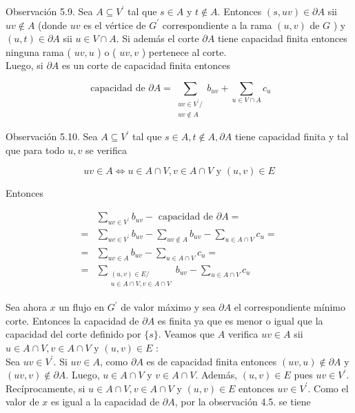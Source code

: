 \documentclass[10pt]{article}
\begin{document}
Observación 5.9. Sea $A \subseteq V^{\prime}$ tal que $s \in A$ y $t \notin A$. Entonces $(s, u v) \in \partial A$ sii $u v \notin A$ (donde $u v$ es el vértice de $G^{\prime}$ correspondiente a la rama $(u, v)$ de $G$ ) y $(u, t) \in \partial A$ sii $u \in V \cap A$. Si además el corte $\partial A$ tiene capacidad finita entonces ninguna rama ( $u v, u$ ) o ( $u v, v$ ) pertenece al corte.\\
Luego, si $\partial A$ es un corte de capacidad finita entonces

$$
\text { capacidad de } \partial A=\sum_{\substack{u v \in V^{\prime} / \\ u v \notin A}} b_{u v}+\sum_{u \in V \cap A} c_{u}
$$

Observación 5.10. Sea $A \subseteq V^{\prime}$ tal que $s \in A, t \notin A, \partial A$ tiene capacidad finita y tal que para todo $u, v$ se verifica

$$
u v \in A \Longleftrightarrow u \in A \cap V, v \in A \cap V \text { y }(u, v) \in E
$$

Entonces

$$
\begin{aligned}
& \sum_{u v \in V^{\prime}} b_{u v}-\text { capacidad de } \partial A= \\
= & \sum_{u v \in V^{\prime}} b_{u v}-\sum_{u v \notin A} b_{u v}-\sum_{u \in A \cap V} c_{u}= \\
= & \sum_{u v \in A} b_{u v}-\sum_{u \in A \cap V} c_{u}= \\
= & \sum_{\substack{(u, v) \in E / \\
u \in A \cap V, v \in A \cap V}} b_{u v}-\sum_{u \in A \cap V} c_{u}
\end{aligned}
$$

Sea ahora $x$ un flujo en $G^{\prime}$ de valor máximo y sea $\partial A$ el correspondiente mínimo corte. Entonces la capacidad de $\partial A$ es finita ya que es menor o igual que la capacidad del corte definido por $\{s\}$. Veamos que $A$ verifica $u v \in A$ sii $u \in A \cap V, v \in A \cap V$ y $(u, v) \in E$ :\\
Sea $u v \in V^{\prime}$. Si $u v \in A$, como $\partial A$ es de capacidad finita entonces $(u v, u) \notin \partial A$ y $(u v, v) \notin \partial A$. Luego, $u \in A \cap V$ y $v \in A \cap V$. Además, $(u, v) \in E$ pues $u v \in V^{\prime}$.\\
Recíprocamente, si $u \in A \cap V, v \in A \cap V$ y $(u, v) \in E$ entonces $u v \in V^{\prime}$. Como el valor de $x$ es igual a la capacidad de $\partial A$, por la observación 4.5. se tiene
\end{document}
